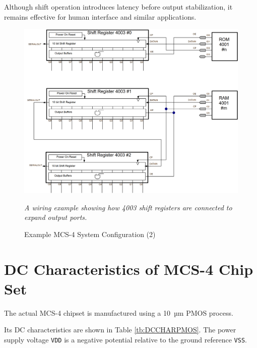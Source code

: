 Although shift operation introduces latency before output stabilization, it remains effective for human interface and similar applications.

\begin{figure}[h]
    \includegraphics[width=1.0\columnwidth]{./Figure/MCS4System(2).png}
    \caption{Example MCS-4 System Configuration (2)}
    \textit{A wiring example showing how 4003 shift registers are connected to expand output ports.}
    \label{fig:MCS4SYSTEM2}
    \end{figure}

\section{DC Characteristics of MCS-4 Chip Set}
The actual MCS-4 chipset is manufactured using a 10~µm PMOS process. 

Its DC characteristics are shown in Table \ref{tb:DCCHARPMOS}.
The power supply voltage \texttt{VDD} is a negative potential relative to the ground reference \texttt{VSS}.

